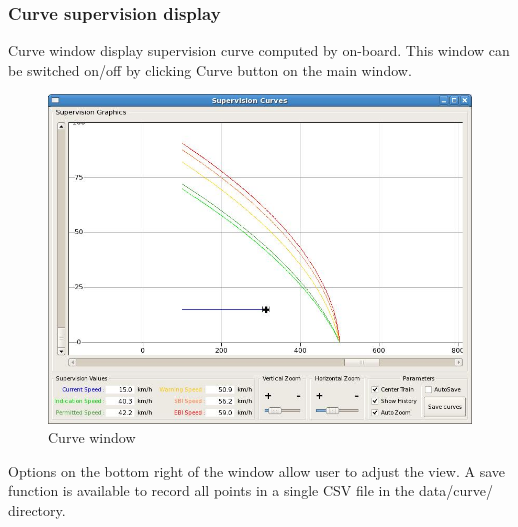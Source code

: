 \documentclass{template/openetcs}
\begin{document}
\subsubsection{Curve supervision display}
Curve window display supervision curve computed by on-board. This window can be switched on/off by clicking Curve button on the main window.
\begin{figure}[!h]
  \centering
  \includegraphics[width=\textwidth]{image/test_runner_supervision_curves}
  \caption{Curve window}
  \label{fig:Curve window}
\end{figure}
Options on the bottom right of the window allow user to adjust the view. 
A save function is available to record all points in a single CSV file in the data/curve/ directory.
\end{document}
